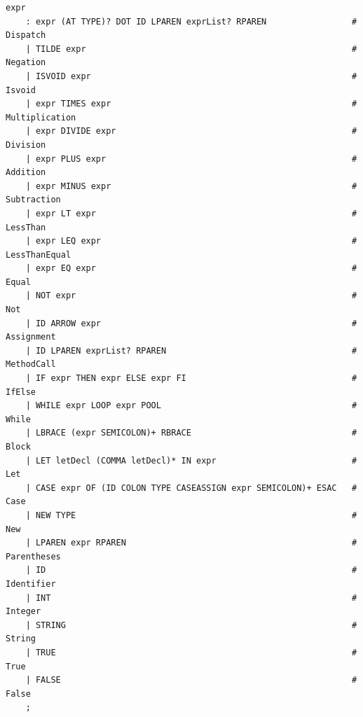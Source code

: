 \documentclass[titlepage]{article}
\begin{document}
\begin{lstlisting}[basicstyle=\ttfamily]
expr                                                                                                       
    : expr (AT TYPE)? DOT ID LPAREN exprList? RPAREN                 # Dispatch                            
    | TILDE expr                                                     # Negation                            
    | ISVOID expr                                                    # Isvoid                              
    | expr TIMES expr                                                # Multiplication                      
    | expr DIVIDE expr                                               # Division                            
    | expr PLUS expr                                                 # Addition                            
    | expr MINUS expr                                                # Subtraction                         
    | expr LT expr                                                   # LessThan                            
    | expr LEQ expr                                                  # LessThanEqual                       
    | expr EQ expr                                                   # Equal                               
    | NOT expr                                                       # Not                                 
    | ID ARROW expr                                                  # Assignment                          
    | ID LPAREN exprList? RPAREN                                     # MethodCall                          
    | IF expr THEN expr ELSE expr FI                                 # IfElse                              
    | WHILE expr LOOP expr POOL                                      # While                               
    | LBRACE (expr SEMICOLON)+ RBRACE                                # Block                               
    | LET letDecl (COMMA letDecl)* IN expr                           # Let                                 
    | CASE expr OF (ID COLON TYPE CASEASSIGN expr SEMICOLON)+ ESAC   # Case                                
    | NEW TYPE                                                       # New                                 
    | LPAREN expr RPAREN                                             # Parentheses                         
    | ID                                                             # Identifier                          
    | INT                                                            # Integer                             
    | STRING                                                         # String                              
    | TRUE                                                           # True                                
    | FALSE                                                          # False                               
    ;                                                                                                      
                                                                                                           

\end{lstlisting}
\end{document}
